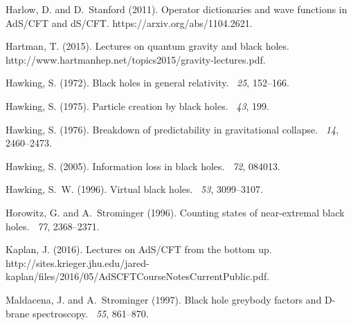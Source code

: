 \documentclass[12pt]{article}
\begin{document}
\begin{thebibliography}{}
Harlow, D. and D.~Stanford (2011).
\newblock Operator dictionaries and wave functions in {A}d{S}/{CFT} and
  d{S}/{CFT}.
\newblock https://arxiv.org/abs/1104.2621.

Hartman, T. (2015).
\newblock Lectures on quantum gravity and black holes.
\newblock http://www.hartmanhep.net/topics2015/gravity-lectures.pdf.

Hawking, S. (1972).
\newblock Black holes in general relativity.
~{\em 25}, 152--166.

Hawking, S. (1975).
\newblock Particle creation by black holes.
~{\em 43}, 199.

Hawking, S. (1976).
\newblock Breakdown of predictability in gravitational collapse.
~{\em 14}, 2460--2473.

Hawking, S. (2005).
\newblock Information loss in black holes.
~{\em 72}, 084013.

Hawking, S.~W. (1996).
\newblock Virtual black holes.
~{\em 53}, 3099--3107.

Horowitz, G. and A.~Strominger (1996).
\newblock Counting states of near-extremal black holes.
~{\em 77}, 2368--2371.

Kaplan, J. (2016).
\newblock Lectures on {A}d{S}/{CFT} from the bottom up.
\newblock
  http://sites.krieger.jhu.edu/jared-kaplan/files/2016/05/AdSCFTCourseNotesCurrentPublic.pdf.

Maldacena, J. and A.~Strominger (1997).
\newblock Black hole greybody factors and {D}-brane spectroscopy.
~{\em 55}, 861--870.


\end{thebibliography}
\end{document}
